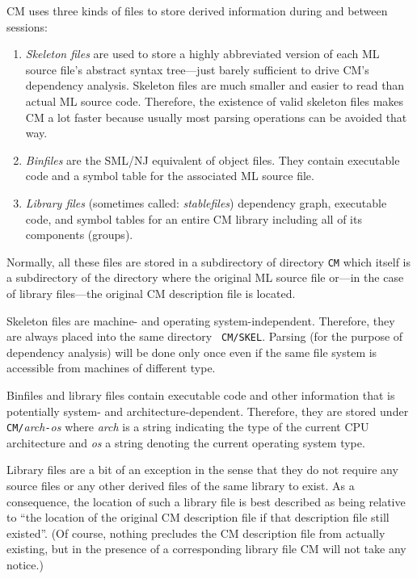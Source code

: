 \documentclass{article}
\begin{document}
CM uses three kinds of files to store derived information during and
between sessions:

\begin{enumerate}
\item {\it Skeleton files} are used to store a highly abbreviated
version of each ML source file's abstract syntax tree---just barely
sufficient to drive CM's dependency analysis.  Skeleton files are much
smaller and easier to read than actual ML source code.  Therefore, the
existence of valid skeleton files makes CM a lot faster because
usually most parsing operations can be avoided that way.
\item {\it Binfiles} are the SML/NJ equivalent of object files.  They
contain executable code and a symbol table for the associated ML
source file.
\item {\it Library files} (sometimes called: {\em stablefiles})
dependency graph, executable code, and symbol tables for an entire CM
library including all of its components (groups).
\end{enumerate}

Normally, all these files are stored in a subdirectory of directory
{\tt CM} which itself is a subdirectory of the directory where the
original ML source file or---in the case of library files---the
original CM description file is located.

Skeleton files are machine- and operating system-independent.
Therefore, they are always placed into the same directory {\tt
CM/SKEL}. Parsing (for the purpose of dependency analysis) will be
done only once even if the same file system is accessible from
machines of different type.

Binfiles and library files contain executable code and other
information that is potentially system- and architecture-dependent.
Therefore, they are stored under {\tt CM/}{\it arch}{\tt -}{\it os}
where {\it arch} is a string indicating the type of the current
CPU architecture and {\it os} a string denoting the current operating
system type.

Library files are a bit of an exception in the sense that they do not
require any source files or any other derived files of the same
library to exist.  As a consequence, the location of such a library
file is best described as being relative to ``the location of the
original CM description file if that description file still existed''.
(Of course, nothing precludes the CM description file from actually
existing, but in the presence of a corresponding library file CM will
not take any notice.)
\end{document}
